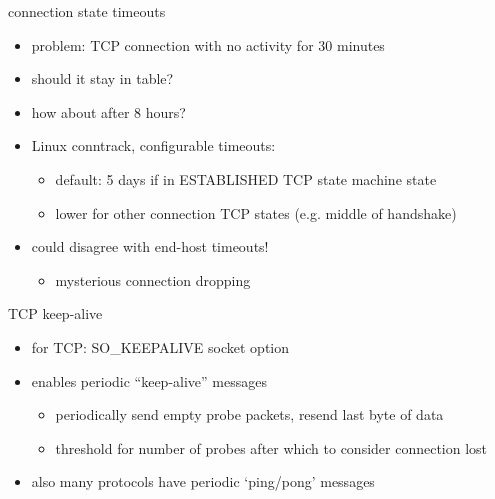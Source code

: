 \begin{frame}{connection state timeouts}
    \begin{itemize}
    \item problem: TCP connection with no activity for 30 minutes
    \item should it stay in table?
    \item how about after 8 hours?
    \vspace{.5cm}
    \item Linux conntrack, configurable timeouts:
        \begin{itemize}
        \item default: 5 days if in ESTABLISHED TCP state machine state
        \item lower for other connection TCP states (e.g. middle of handshake)
        \end{itemize}
    \item could disagree with end-host timeouts!
        \begin{itemize}
        \item mysterious connection dropping
        \end{itemize}
    \end{itemize}
\end{frame}

\begin{frame}{TCP keep-alive}
    \begin{itemize}
    \item for TCP: SO\_KEEPALIVE socket option
    \item enables periodic ``keep-alive'' messages
        \begin{itemize}
        \item periodically send empty probe packets, resend last byte of data
        \item threshold for number of probes after which to consider connection lost
        \end{itemize}
    \vspace{.5cm}
    \item also many protocols have periodic `ping/pong' messages
    \end{itemize}
\end{frame}
